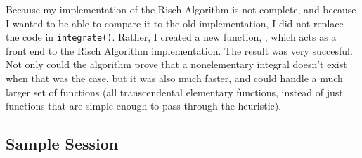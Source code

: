 Because my implementation of the Risch Algorithm is not complete, and
because I wanted to be able to compare it to the old implementation, I
did not replace the code in \texttt{integrate()}.  Rather, I created a
new function, \rischintegrate{}, which acts as a front end to the Risch
Algorithm implementation.  The result was very succesful.  Not only
could the algorithm prove that a nonelementary integral doesn't exist
when that was the case, but it was also much faster, and could handle a
much larger set of functions (all \gls{transcendental} \gls{elementary}
functions, instead of just functions that are simple enough to pass
through the heuristic).  

\subsection{Sample Session} 
\label{sample}


